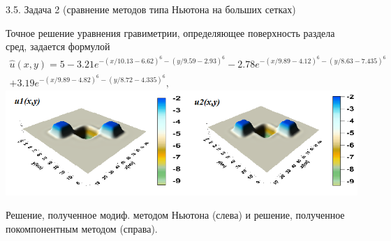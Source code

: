 \documentclass[10pt,pdf, mathserif, hyperref={unicode}]{beamer}
\begin{document}
\begin{frame}{\small 3.5. Задача 2 (сравнение методов типа Ньютона на больших сетках)}
	
	Точное решение уравнения гравиметрии, определяющее поверхность раздела сред, задается формулой
	\begin{equation*}
	\begin{aligned}
	\hat{u}(x,y)=5-3.21e^{-(x/10.13-6.62)^6-(y/9.59-2.93)^6}-2.78e^{-(x/9.89-4.12)^6-(y/8.63-7.435)^6}\\+3.19e^{-(x/9.89-4.82)^6-(y/8.72-4.335)^6},
	\end{aligned} 
	\end{equation*}
%	
\includegraphics[width=\textwidth, height=0.35\textheight]{gravy_kiev2015_methods.png}

\centering
Решение, полученное модиф. методом Ньютона (слева) и решение, полученное покомпонентным методом (справа).

\end{frame}
%	
%	
%	
%	
\end{document}
